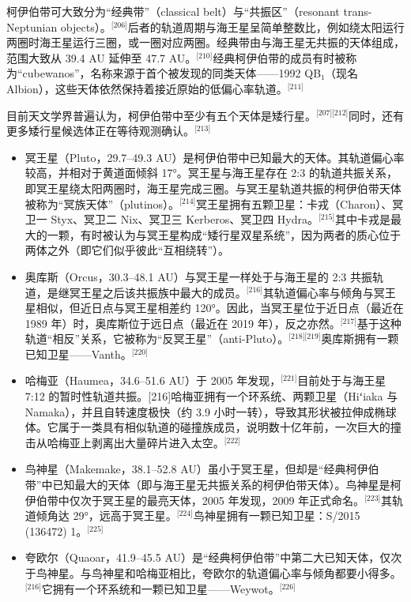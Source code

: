 柯伊伯带可大致分为“经典带”（classical belt）与“共振区”（resonant trans-Neptunian objects）。\(^\text{[206]}\)后者的轨道周期与海王星呈简单整数比，例如绕太阳运行两圈时海王星运行三圈，或一圈对应两圈。经典带由与海王星无共振的天体组成，范围大致从 39.4 AU 延伸至 47.7 AU。\(^\text{[210]}\)经典柯伊伯带的成员有时被称为“cubewanos”，名称来源于首个被发现的同类天体——1992 QB₁（现名 Albion），这些天体依然保持着接近原始的低偏心率轨道。\(^\text{[211]}\)

目前天文学界普遍认为，柯伊伯带中至少有五个天体是矮行星。\(^\text{[207][212]}\)同时，还有更多矮行星候选体正在等待观测确认。\(^\text{[213]}\)
\begin{itemize}
\item 冥王星（Pluto，29.7–49.3 AU）是柯伊伯带中已知最大的天体。其轨道偏心率较高，并相对于黄道面倾斜 17°。冥王星与海王星存在 2:3 的轨道共振关系，即冥王星绕太阳两圈时，海王星完成三圈。与冥王星轨道共振的柯伊伯带天体被称为“冥族天体”（plutinos）。\(^\text{[214]}\)冥王星拥有五颗卫星：卡戎（Charon）、冥卫一 Styx、冥卫二 Nix、冥卫三 Kerberos、冥卫四 Hydra。\(^\text{[215]}\)其中卡戎是最大的一颗，有时被认为与冥王星构成“矮行星双星系统”，因为两者的质心位于两体之外（即它们似乎彼此“互相绕转”）。
\item 奥库斯（Orcus，30.3–48.1 AU）与冥王星一样处于与海王星的 2:3 共振轨道，是继冥王星之后该共振族中最大的成员。\(^\text{[216]}\)其轨道偏心率与倾角与冥王星相似，但近日点与冥王星相差约 120°。因此，当冥王星位于近日点（最近在 1989 年）时，奥库斯位于远日点（最近在 2019 年），反之亦然。\(^\text{[217]}\)基于这种轨道“相反”关系，它被称为“反冥王星”（anti-Pluto）。\(^\text{[218][219]}\)奥库斯拥有一颗已知卫星——Vanth。\(^\text{[220]}\)
\item 哈梅亚（Haumea，34.6–51.6 AU）于 2005 年发现，\(^\text{[221]}\)目前处于与海王星 7:12 的暂时性轨道共振。[216]哈梅亚拥有一个环系统、两颗卫星（Hiʻiaka 与 Namaka），并且自转速度极快（约 3.9 小时一转），导致其形状被拉伸成椭球体。它属于一类具有相似轨道的碰撞族成员，说明数十亿年前，一次巨大的撞击从哈梅亚上剥离出大量碎片进入太空。\(^\text{[222]}\)
\item 鸟神星（Makemake，38.1–52.8 AU）虽小于冥王星，但却是“经典柯伊伯带”中已知最大的天体（即与海王星无共振关系的柯伊伯带天体）。鸟神星是柯伊伯带中仅次于冥王星的最亮天体，2005 年发现，2009 年正式命名。\(^\text{[223]}\)其轨道倾角达 29°，远高于冥王星。\(^\text{[224]}\)鸟神星拥有一颗已知卫星：S/2015 (136472) 1。\(^\text{[225]}\)
\item 夸欧尔（Quaoar，41.9–45.5 AU）是“经典柯伊伯带”中第二大已知天体，仅次于鸟神星。与鸟神星和哈梅亚相比，夸欧尔的轨道偏心率与倾角都要小得多。\(^\text{[216]}\)它拥有一个环系统和一颗已知卫星——Weywot。\(^\text{[226]}\)
\end{itemize}
